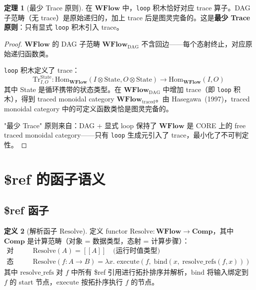 \documentclass[11pt,a4paper]{article}
\theoremstyle{definition}
\newtheorem{theorem}{定理}[section]
\theoremstyle{definition}
\newtheorem{definition}[theorem]{定义}
\theoremstyle{remark}
\newcommand{\cat}[1]{\mathbf{#1}}
\newcommand{\catWFlow}{\cat{WFlow}}
\newcommand{\catComp}{\cat{Comp}}
\newcommand{\homset}[3]{\mathrm{Hom}_{#1}(#2, #3)}
\newcommand{\functor}[3]{#1: #2 \to #3}
\newcommand{\tensor}{\otimes}
\newcommand{\llbracket}{[\![}
\newcommand{\rrbracket}{]\!]}
\begin{document}
\begin{theorem}[最少 Trace 原则]
在 $\catWFlow$ 中，\texttt{loop} 积木恰好对应 trace 算子。DAG 子范畴（无 trace）是原始递归的，加上 trace 后是图灵完备的。这是\textbf{最少 Trace 原则}：只有显式 \texttt{loop} 积木引入 trace。
\end{theorem}

\begin{proof}
$\catWFlow$ 的 DAG 子范畴 $\catWFlow_{\mathrm{DAG}}$ 不含回边——每个态射终止，对应原始递归函数类。

\texttt{loop} 积木定义了 trace：
\[
\mathrm{Tr}^{\mathrm{State}}_{I,O}: \homset{\catWFlow}{I\tensor\mathrm{State}}{O\tensor\mathrm{State}} \to \homset{\catWFlow}{I}{O}
\]
其中 State 是循环携带的状态类型。在 $\catWFlow_{\mathrm{DAG}}$ 中增加 trace（即 \texttt{loop} 积木），得到 traced monoidal category $\catWFlow_{\mathrm{traced}}$。由 Hasegawa~(1997)，traced monoidal category 中的可定义函数类恰是图灵完备的。

"最少 Trace" 原则来自：DAG + 显式 loop 保持了 $\catWFlow$ 是 CORE 上的 free traced monoidal category——只有 \texttt{loop} 生成元引入了 trace，最小化了不可判定性。
\end{proof}

\section{\$ref 的函子语义}

\subsection{\$ref 函子}

\begin{definition}[解析函子 $\mathrm{Resolve}$]
定义 functor $\functor{\mathrm{Resolve}}{\catWFlow}{\catComp}$，其中 $\catComp$ 是计算范畴（对象 = 数据类型，态射 = 计算步骤）：
\[
\begin{aligned}
\text{对象映射:}&\quad \mathrm{Resolve}(A) = \llbracket A \rrbracket \quad\text{(运行时值类型)} \\
\text{态射映射:}&\quad \mathrm{Resolve}(f: A \to B) = \lambda x.\; \mathrm{execute}(f,\; \mathrm{bind}(x,\; \mathrm{resolve\_refs}(f, x)))
\end{aligned}
\]
其中 $\mathrm{resolve\_refs}$ 对 $f$ 中所有 \$ref 引用进行拓扑排序并解析，$\mathrm{bind}$ 将输入绑定到 $f$ 的 start 节点，$\mathrm{execute}$ 按拓扑序执行 $f$ 的节点。
\end{definition}
\end{document}
